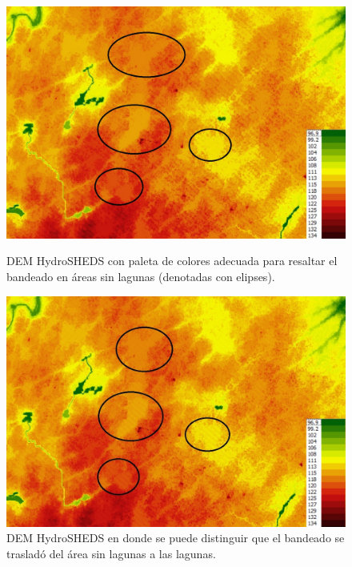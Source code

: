 \documentclass[10pt,a4paper, twoside]{report}
\begin{document}
\begin{figure}[!htb]
   \begin{minipage}{0.48\textwidth}
			\centering
			\includegraphics[width=1.0\linewidth]{imagenes/HydroSHEDSBandeadoZoom.jpg}
			\caption{DEM HydroSHEDS con paleta de colores adecuada para resaltar el bandeado en áreas sin lagunas (denotadas con elipses).}
			\label{HydroSHEDSBandeadoZoom}
   \end{minipage}\hfill
   \begin {minipage}{0.48\textwidth}
			\centering
			\includegraphics[width=1.0\linewidth]{imagenes/HydroSHEDSBandeadoZoomFourier.jpg}
			\caption{DEM HydroSHEDS en donde se puede distinguir que el bandeado se trasladó del área sin lagunas a las lagunas.}
			\label{HydroSHEDSBandeadoZoomFourier}
   \end{minipage}
\end{figure}
\end{document}

